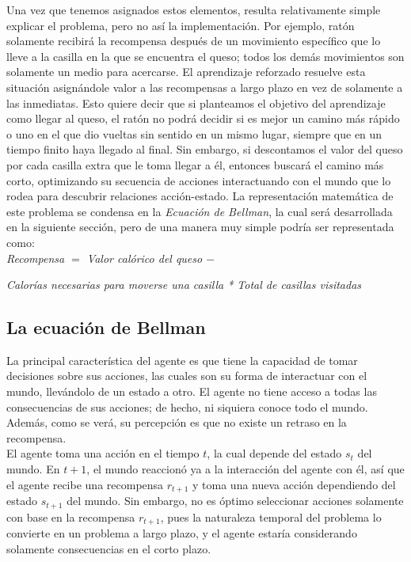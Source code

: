Una vez que tenemos asignados estos elementos, resulta relativamente simple explicar el problema, pero no as\'i la implementaci\'on. Por ejemplo, rat\'on solamente recibir\'a la recompensa despu\'es de un movimiento espec\'ifico que lo lleve a la casilla en la que se encuentra el queso; todos los dem\'as movimientos son solamente un medio para acercarse. El aprendizaje reforzado resuelve esta situaci\'on asign\'andole valor a las recompensas a largo plazo en vez de solamente a las inmediatas. Esto quiere decir que si planteamos el objetivo del aprendizaje como llegar al queso, el rat\'on no podr\'a decidir si es mejor un camino m\'as r\'apido o uno en el que dio vueltas sin sentido en un mismo lugar, siempre que en un tiempo finito haya llegado al final. Sin embargo, si descontamos el valor del queso por cada casilla extra que le toma llegar a \'el, entonces buscar\'a el camino m\'as corto, optimizando su secuencia de acciones interactuando con el mundo que lo rodea para descubrir relaciones acci\'on-estado. La representaci\'on matem\'atica de este problema se condensa en la \textit{Ecuaci\'on de Bellman}, la cual ser\'a desarrollada en la siguiente secci\'on, pero de una manera muy simple podr\'ia ser representada como:\\

\textit{Recompensa $=$ Valor cal\'orico del queso $-$}

\hspace{22mm} \textit{Calor\'ias necesarias para moverse una casilla * Total de casillas visitadas}
  
\subsection{La ecuaci\'on de Bellman}  
    
La principal caracter\'istica del agente es que tiene la capacidad de tomar decisiones sobre sus acciones, las cuales son su forma de interactuar con el mundo, llev\'andolo de un estado a otro. El agente no tiene acceso a todas las consecuencias de sus acciones; de hecho, ni siquiera conoce todo el mundo. Adem\'as, como se ver\'a, su percepci\'on es que no existe un retraso en la recompensa.\\

El agente toma una acci\'on en el tiempo $t$, la cual depende del estado $s_t$ del mundo. En $t+1$, el mundo reaccion\'o ya a la interacci\'on del agente con \'el, as\'i que el agente recibe una recompensa $r_{t+1}$ y toma una nueva acci\'on dependiendo del estado $s_{t+1}$ del mundo. Sin embargo, no es \'optimo seleccionar acciones solamente con base en la recompensa $r_{t+1}$, pues la naturaleza temporal del problema lo convierte en un problema a largo plazo, y el agente estar\'ia considerando solamente consecuencias en el corto plazo.\\

